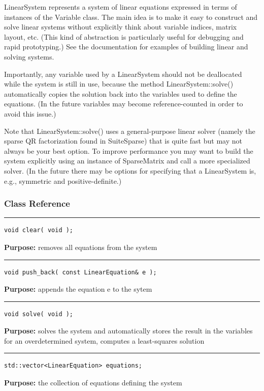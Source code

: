 \documentclass{article}
\begin{document}
 LinearSystem represents a system of linear equations expressed in terms of instances of the Variable class.  The main idea is to make it easy to construct and solve linear systems without explicitly think about variable indices, matrix layout, etc.  (This kind of abstraction is particularly useful for debugging and rapid prototyping.)  See the documentation for examples of building linear and solving systems. 

 Importantly, any variable used by a LinearSystem should not be deallocated while the system is still in use, because the method LinearSystem::solve() automatically copies the solution back into the variables used to define the equations.  (In the future variables may become reference-counted in order to avoid this issue.) 

 Note that LinearSystem::solve() uses a general-purpose linear solver (namely the sparse QR factorization found in SuiteSparse) that is quite fast but may not always be your best option.  To improve performance you may want to build the system explicitly using an instance of SparseMatrix and call a more specialized solver.  (In the future there may be options for specifying that a LinearSystem is, e.g., symmetric and positive-definite.) 



\subsubsection{Class Reference}

\rule{5in}{1pt}
\begin{verbatim}
void clear( void );
\end{verbatim}
\textbf{Purpose:}
removes all equations from the system

\hspace{-.21in}\rule{5in}{1pt}
\begin{verbatim}
void push_back( const LinearEquation& e );
\end{verbatim}
\textbf{Purpose:}
appends the equation e to the sytem

\hspace{-.21in}\rule{5in}{1pt}
\begin{verbatim}
void solve( void );
\end{verbatim}
\textbf{Purpose:}
solves the system and automatically stores the result in the variables
for an overdetermined system, computes a least-squares solution

\hspace{-.21in}\rule{5in}{1pt}
\begin{verbatim}
std::vector<LinearEquation> equations;
\end{verbatim}
\textbf{Purpose:}
the collection of equations defining the system
\end{document}
